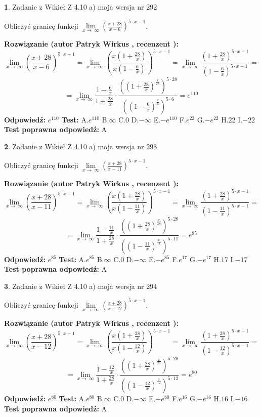 \documentclass[12pt, a4paper]{article}
\theoremstyle{definition} %
\newtheorem{zad}{}
\newcommand{\zadStart}[1]{\begin{zad}#1\newline}
\newcommand{\zadStop}{\end{zad}}
\newcommand{\rozwStart}[2]{\noindent \textbf{Rozwiązanie (autor #1 , recenzent #2): }\newline}
\newcommand{\rozwStop}{\newline}
\newcommand{\odpStart}{\noindent \textbf{Odpowiedź:}\newline}
\newcommand{\odpStop}{\newline}
\newcommand{\testStart}{\noindent \textbf{Test:}\newline}
\newcommand{\testStop}{\newline}
\newcommand{\kluczStart}{\noindent \textbf{Test poprawna odpowiedź:}\newline}
\newcommand{\kluczStop}{\newline}
\begin{document}
\zadStart{Zadanie z Wikieł Z 4.10 a) moja wersja nr 292}

Obliczyć granicę funkcji  $\lim\limits_{x\to\ \infty}(\frac{x+28}{x-6})^{5\cdot x-1}$.
\zadStop
\rozwStart{Patryk Wirkus}{}
$$\lim\limits_{x\to\ \infty}(\frac{x+28}{x-6})^{5\cdot x-1} = \lim\limits_{x\to\ \infty}(\frac{x(1+\frac{28}{x})}{x(1-\frac{6}{x})})^{5\cdot x-1}=\lim\limits_{x\to\ \infty}\frac{(1+\frac{28}{x})^{5\cdot x-1}}{(1-\frac{6}{x})^{5\cdot x-1}}=$$
$$=\lim\limits_{x\to\ \infty}\frac{1-\frac{6}{x}}{1+\frac{28}{x}}\cdot\frac{((1+\frac{28}{x})^{\frac{x}{28}})^{5\cdot28}}{((1-\frac{6}{x})^{\frac{x}{6}})^{5\cdot6}}=e^{110}$$
\rozwStop
\odpStart
$e^{110}$
\odpStop
\testStart
A.$e^{110}$ B.$\infty$ C.$0$ D.$-\infty$ E.$-e^{110}$
F.$e^{22}$ G.$-e^{22}$
H.$22$
I.$-22$
\testStop
\kluczStart
A
\kluczStop



\zadStart{Zadanie z Wikieł Z 4.10 a) moja wersja nr 293}

Obliczyć granicę funkcji  $\lim\limits_{x\to\ \infty}(\frac{x+28}{x-11})^{5\cdot x-1}$.
\zadStop
\rozwStart{Patryk Wirkus}{}
$$\lim\limits_{x\to\ \infty}(\frac{x+28}{x-11})^{5\cdot x-1} = \lim\limits_{x\to\ \infty}(\frac{x(1+\frac{28}{x})}{x(1-\frac{11}{x})})^{5\cdot x-1}=\lim\limits_{x\to\ \infty}\frac{(1+\frac{28}{x})^{5\cdot x-1}}{(1-\frac{11}{x})^{5\cdot x-1}}=$$
$$=\lim\limits_{x\to\ \infty}\frac{1-\frac{11}{x}}{1+\frac{28}{x}}\cdot\frac{((1+\frac{28}{x})^{\frac{x}{28}})^{5\cdot28}}{((1-\frac{11}{x})^{\frac{x}{11}})^{5\cdot11}}=e^{85}$$
\rozwStop
\odpStart
$e^{85}$
\odpStop
\testStart
A.$e^{85}$ B.$\infty$ C.$0$ D.$-\infty$ E.$-e^{85}$
F.$e^{17}$ G.$-e^{17}$
H.$17$
I.$-17$
\testStop
\kluczStart
A
\kluczStop



\zadStart{Zadanie z Wikieł Z 4.10 a) moja wersja nr 294}

Obliczyć granicę funkcji  $\lim\limits_{x\to\ \infty}(\frac{x+28}{x-12})^{5\cdot x-1}$.
\zadStop
\rozwStart{Patryk Wirkus}{}
$$\lim\limits_{x\to\ \infty}(\frac{x+28}{x-12})^{5\cdot x-1} = \lim\limits_{x\to\ \infty}(\frac{x(1+\frac{28}{x})}{x(1-\frac{12}{x})})^{5\cdot x-1}=\lim\limits_{x\to\ \infty}\frac{(1+\frac{28}{x})^{5\cdot x-1}}{(1-\frac{12}{x})^{5\cdot x-1}}=$$
$$=\lim\limits_{x\to\ \infty}\frac{1-\frac{12}{x}}{1+\frac{28}{x}}\cdot\frac{((1+\frac{28}{x})^{\frac{x}{28}})^{5\cdot28}}{((1-\frac{12}{x})^{\frac{x}{12}})^{5\cdot12}}=e^{80}$$
\rozwStop
\odpStart
$e^{80}$
\odpStop
\testStart
A.$e^{80}$ B.$\infty$ C.$0$ D.$-\infty$ E.$-e^{80}$
F.$e^{16}$ G.$-e^{16}$
H.$16$
I.$-16$
\testStop
\kluczStart
A
\kluczStop
\end{document}
